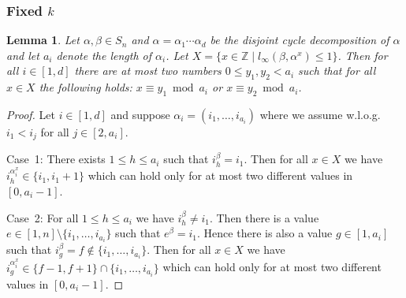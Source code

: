 \documentclass{article}
\newtheorem{lemma}{Lemma}
\begin{document}
\subsubsection{Fixed $k$}
\begin{lemma}\label{lemmak1atmost2solutions}
Let $\alpha,\beta \in S_n$ and $\alpha = \alpha_1 \cdots \alpha_d$ be the disjoint cycle decomposition of $\alpha$ and let $a_i$ denote the length of $\alpha_i$. Let $X = \{x \in \mathbb{Z} \mid l_\infty(\beta, \alpha^x) \leq 1\}$. Then for all $i \in [1,d]$ there are at most two numbers $0 \leq y_1,y_2 < a_i$ such that for all $x \in X$ the following holds: $x \equiv y_1 \bmod a_i$ or $x \equiv y_2 \bmod a_i$.
\end{lemma}
\begin{proof}
Let $i \in [1,d]$ and suppose $\alpha_i = (i_1,\dots,i_{a_i})$ where we assume w.l.o.g. $i_1 < i_j$ for all $j \in [2,a_i]$.

Case~1: There exists $1 \leq h \leq a_i$ such that $i_h^\beta = i_1$. Then for all $x \in X$ we have $i_h^{\alpha_i^x} \in \{i_1,i_1+1\}$ which can hold only for at most two different values in $[0,a_i-1]$.

Case~2: For all $1 \leq h \leq a_i$ we have $i_h^\beta \neq i_1$. Then there is a value $e \in [1,n] \setminus \{i_1,\dots,i_{a_i}\}$ such that $e^\beta = i_1$. Hence there is also a value $g \in [1,a_i]$ such that $i_g^\beta = f \not \in \{i_1,\dots,i_{a_i}\}$. Then for all $x \in X$ we have $i_g^{\alpha_i^x} \in \{f-1,f+1\} \cap \{i_1,\dots,i_{a_i}\}$ which can hold only for at most two different values in $[0,a_i-1]$.
\end{proof}
\end{document}
